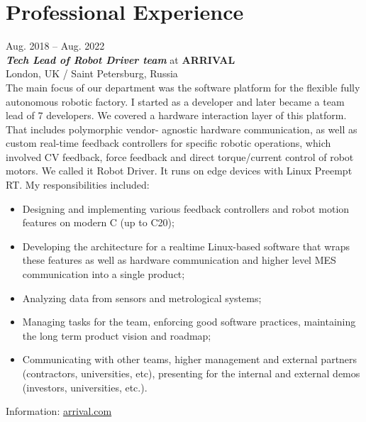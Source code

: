 \documentclass[a4paper,10pt]{article}
\def\CC{{C\nolinebreak[4]\hspace{-.05em}\raisebox{.4ex}{\tiny\bf ++}}}
\begin{document}
\begin{adjustbox}{valign=t}
\begin{minipage}{0.6\textwidth} %

\section*{Professional Experience}
\raggedright
\textcolor{ColorOne}{Aug. 2018 -- Aug. 2022}\\
\emph{\textbf{Tech Lead of Robot Driver team}} at \textbf{ARRIVAL}\\
London, UK / Saint Petersburg, Russia\\
\vspace{10 pt}
The main focus of our department was the software platform for the flexible fully autonomous robotic factory.
I started as a developer and later became a team lead of 7 developers. We covered a hardware interaction layer 
of this platform. That includes polymorphic vendor- agnostic hardware communication, as well as custom real-time
feedback controllers for specific robotic operations, which involved CV feedback, force feedback and direct 
torque/current control of robot motors. We called it Robot Driver. It runs on edge devices with Linux Preempt RT.
My responsibilities included:
\begin{itemize}[noitemsep]
	\item Designing and implementing various feedback controllers and robot motion features on modern \CC 
	(up to \CC20);
	\item Developing the architecture for a realtime Linux-based software that wraps these features as well as 
	hardware communication and higher level MES communication into a single product;
	\item Analyzing data from sensors and metrological systems;
	\item Managing tasks for the team, enforcing good software practices, maintaining the long term product vision
	and roadmap;
	\item Communicating with other teams, higher management and external partners (contractors, universities, etc),
	presenting for the internal and external demos (investors, universities, etc.).
\end{itemize}
Information: \href{https://arrival.com}{\underline{arrival.com}}
\vspace{10 pt}
	

\end{minipage}
\end{adjustbox}
\end{document}
